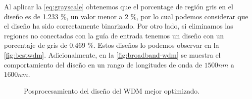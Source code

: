 Al aplicar la \autoref{eq:grayscale} obtenemos que el porcentage de región gris en el diseño
es de 1.233 \%, un valor menor a 2 \%, por lo cual podemos considerar que el diseño ha sido
correctamente binarizado. Por otro lado, si eliminamos las regiones no conectadas con la guía de entrada
tenemos un diseño con un porcentaje de gris de 0.469 \%.
Estos diseños lo podemos observar en la \autoref{fig:bestwdm}.
Adicionalmente, en la \autoref{fig:broadband-wdm} se muestra el comportamiento del diseño
en un rango de longitudes de onda de $1500nm$ a $1600 nm$.

\begin{figure}[ht]
  \centering

  \hfill

  \hfill

  \caption{Posprocesamiento del diseño del WDM mejor optimizado.}
  \label{fig:bestwdm}

\end{figure}

